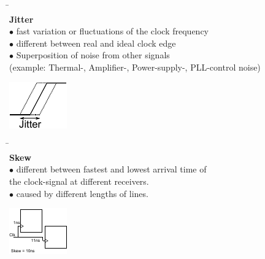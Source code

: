 \begin{multicols}{2}
	\begin{tabbing}
	\hspace{10mm} \= \hspace{5mm} \= \\
	\textbf{Jitter}\hfill \\
						\>$\bullet$ \> fast variation or fluctuations of the clock frequency \\
						\>$\bullet$ \> different between real and ideal clock edge \\
						\>$\bullet$ \> Superposition of noise from other signals \\
		 				\> \>(example: Thermal-, Amplifier-, Power-supply-, PLL-control noise)
	\end{tabbing}
	\vfill
	\columnbreak
	\hspace{40mm}
	\includegraphics[width=0.3\linewidth]{images/High_Speed_Digital/Jitter.pdf}
\end{multicols}
	
\begin{multicols}{2}
	\begin{tabbing}
		\hspace{10mm} \= \hspace{5mm} \= \\
		\textbf{Skew} \hfill \\
						\>$\bullet$ \> different between fastest and lowest arrival time of\\
						\> \> the clock-signal at different receivers.\\
						\>$\bullet$ \> caused by different lengths of lines.
	\end{tabbing}
	\vfill
	\columnbreak
	\hspace{40mm}
	\includegraphics[width=0.35\linewidth]{images/High_Speed_Digital/Skew.pdf}
\end{multicols}

